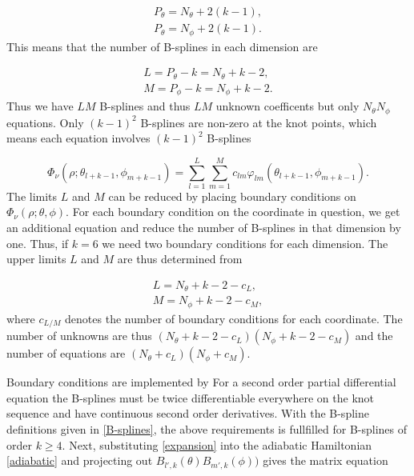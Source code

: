 \begin{equation}
\begin{aligned}
P_{\theta}=N_{\theta}+2(k-1),\\
P_{\theta}=N_{\phi}+2(k-1).
\end{aligned}
\end{equation}
This means that the number of B-splines in each dimension are

\begin{equation}
\begin{aligned}
L = P_{\theta}-k=N_{\theta}+k-2,\\
M = P_{\phi}-k = N_{\phi}+k-2.
\end{aligned}
\end{equation}
Thus we have $LM$ B-splines and thus $LM$ unknown coefficents but only $N_{\theta}N_{\phi}$ equations. Only $(k-1)^2$ B-splines are non-zero at the knot points, which means each equation involves $(k-1)^2$ B-splines

\begin{equation}\label{expansion}
\Phi_{\nu}(\rho;\theta_{l+k-1},\phi_{m+k-1}) = \sum_{l=1}^L\sum_{m=1}^M c_{lm}\varphi_{lm} (\theta_{l+k-1},\phi_{m+k-1}).
\end{equation}
The limits $L$ and $M$ can be reduced by placing boundary conditions on $\Phi_{\nu}(\rho;\theta,\phi)$. For each boundary condition on the coordinate in question, we get an additional equation and reduce the number of B-splines in that dimension by one. Thus, if $k=6$ we need two boundary conditions for each dimension. The upper limits $L$ and $M$ are thus determined from 

\begin{align}
L = N_{\theta}+k-2-c_L,\\
M = N_{\phi}+k-2-c_M,
\end{align}
where $c_{L/M}$ denotes the number of boundary conditions for each coordinate. The number of unknowns are thus $(N_{\theta}+k-2-c_L)(N_{\phi}+k-2-c_M)$ and the number of equations are $(N_{\theta}+c_L)(N_{\phi}+c_M)$.

Boundary conditions are implemented by For a second order partial differential equation the B-splines must be twice differentiable everywhere on the knot sequence and have continuous second order derivatives. With the B-spline definitions given in \ref{B-splines}, the above requirements is fullfilled for B-splines of order $k\geq 4$. Next, substituting \eqref{expansion} into the adiabatic Hamiltonian \eqref{adiabatic} and projecting out $B_{l',k}(\theta)B_{m',k}(\phi))$ gives the matrix equation

